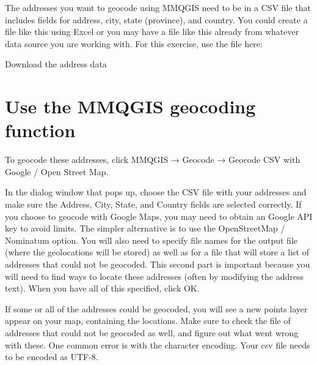 \documentclass[]{book}
\begin{document}
The addresses you want to geocode using MMQGIS need to be in a CSV file that includes fields for address, city, state (province), and country. You could create a file like this using Excel or you may have a file like this already from whatever data source you are working with. For this exercise, use the file here:

Download the address data

\hypertarget{use-the-mmqgis-geocoding-function}{%
\section{Use the MMQGIS geocoding function}\label{use-the-mmqgis-geocoding-function}}

To geocode these addresses, click MMQGIS → Geocode → Geocode CSV with Google / Open Street Map.

In the dialog window that pops up, choose the CSV file with your addresses and make sure the Address, City, State, and Country fields are selected correctly. If you choose to geocode with Google Maps, you may need to obtain an Google API key to avoid limits. The simpler alternative is to use the OpenStreetMap / Nominatum option. You will also need to specify file names for the output file (where the geolocations will be stored) as well as for a file that will store a list of addresses that could not be geocoded. This second part is important because you will need to find ways to locate these addresses (often by modifying the address text). When you have all of this specified, click OK.

If some or all of the addresses could be geocoded, you will see a new points layer appear on your map, containing the locations. Make sure to check the file of addresses that could not be geocoded as well, and figure out what went wrong with these. One common error is with the character encoding. Your csv file needs to be encoded as UTF-8.


\end{document}
